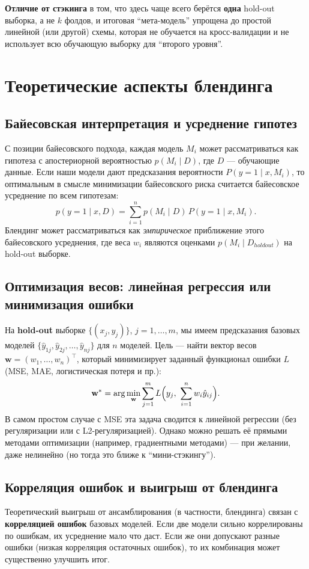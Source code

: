 \textbf{Отличие от стэкинга} в том, что здесь чаще всего берётся \textbf{одна} hold-out выборка, а не $k$ фолдов, и итоговая ``мета-модель'' упрощена до простой линейной (или другой) схемы, которая не обучается на кросс-валидации и не использует всю обучающую выборку для ``второго уровня''.

\section{Теоретические аспекты блендинга}
\subsection{Байесовская интерпретация и усреднение гипотез}
С позиции байесовского подхода, каждая модель $M_i$ может рассматриваться как гипотеза с апостериорной вероятностью $p(M_i \mid D)$, где $D$ --- обучающие данные. Если наши модели дают предсказания вероятности $P(y=1 \mid x, M_i)$, то оптимальным в смысле минимизации байесовского риска считается байесовское усреднение по всем гипотезам:
\[
p(y=1 \mid x, D) = \sum_{i=1}^n p(M_i \mid D) \, P(y=1 \mid x, M_i).
\]
Блендинг может рассматриваться как \textit{эмпирическое} приближение этого байесовского усреднения, где веса $w_i$ являются оценками $p(M_i \mid D_{holdout})$ на hold-out выборке.

\subsection{Оптимизация весов: линейная регрессия или минимизация ошибки}
На \textbf{hold-out} выборке $\{(x_j, y_j)\}$, $j=1,\ldots,m$, мы имеем предсказания базовых моделей $ \{\hat{y}_{1j}, \hat{y}_{2j}, \dots, \hat{y}_{nj}\}$ для $n$ моделей. Цель --- найти вектор весов $\mathbf{w} = (w_1, \ldots, w_n)^\top$, который минимизирует заданный функционал ошибки $L$ (MSE, MAE, логистическая потеря и пр.):
\[
\mathbf{w}^* = \arg\min_{\mathbf{w}} \sum_{j=1}^m L\Bigl(y_j,\ \sum_{i=1}^n w_i \hat{y}_{ij}\Bigr).
\]
В самом простом случае с MSE эта задача сводится к линейной регрессии (без регуляризации или с L2-регуляризацией). Однако можно решать её прямыми методами оптимизации (например, градиентными методами) --- при желании, даже нелинейно (но тогда это ближе к ``мини-стэкингу'').

\subsection{Корреляция ошибок и выигрыш от блендинга}
Теоретический выигрыш от ансамблирования (в частности, блендинга) связан с \textbf{корреляцией ошибок} базовых моделей. Если две модели сильно коррелированы по ошибкам, их усреднение мало что даст. Если же они допускают разные ошибки (низкая корреляция остаточных ошибок), то их комбинация может существенно улучшить итог.

